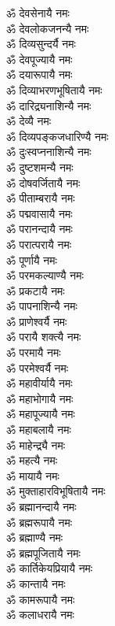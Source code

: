 \begin{flushleft}
\begin{multicols}{2}
ॐ देवसेनायै नमः\\
ॐ देवलोकजनन्यै नमः\\
ॐ दिव्यसुन्दर्यै नमः\\
ॐ देवपूज्यायै नमः\\
ॐ दयारूपायै नमः\\
ॐ दिव्याभरणभूषितायै नमः\\
ॐ दारिद्र्यनाशिन्यै नमः\\
ॐ देव्यै नमः\\
ॐ दिव्यपङ्कजधारिण्यै नमः\\
ॐ दुःस्वप्ननाशिन्यै नमः\hfill{}\\
ॐ दुष्टशमन्यै नमः\\
ॐ दोषवर्जितायै नमः\\
ॐ पीताम्बरायै नमः\\
ॐ पद्मवासायै नमः\\
ॐ परानन्दायै नमः\\
ॐ परात्परायै नमः\\
ॐ पूर्णायै नमः\\
ॐ परमकल्याण्यै नमः\\
ॐ प्रकटायै नमः\\
ॐ पापनाशिन्यै नमः\hfill{}\\
ॐ प्राणेश्वर्यै नमः\\
ॐ परायै शक्त्यै नमः\\
ॐ परमायै नमः\\
ॐ परमेश्वर्यै नमः\\
ॐ महावीर्यायै नमः\\
ॐ महाभोगायै नमः\\
ॐ महापूज्यायै नमः\\
ॐ महाबलायै नमः\\
ॐ माहेन्द्र्यै नमः\\
ॐ महत्यै नमः\hfill{}\\
ॐ मायायै नमः\\
ॐ मुक्ताहारविभूषितायै नमः\\
ॐ ब्रह्मानन्दायै नमः\\
ॐ ब्रह्मरूपायै नमः\\
ॐ ब्रह्माण्यै नमः\\
ॐ ब्रह्मपूजितायै नमः\\
ॐ कार्तिकेयप्रियायै नमः\\
ॐ कान्तायै नमः\\
ॐ कामरूपायै नमः\\
ॐ कलाधरायै नमः\hfill{}\\

\end{multicols}
\end{flushleft}
